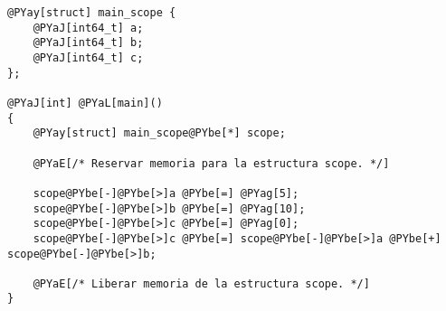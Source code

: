 \begin{Verbatim}[commandchars=@\[\]]
@PYay[struct] main_scope {
    @PYaJ[int64_t] a;
    @PYaJ[int64_t] b;
    @PYaJ[int64_t] c;
};

@PYaJ[int] @PYaL[main]()
{
    @PYay[struct] main_scope@PYbe[*] scope;
    
    @PYaE[/* Reservar memoria para la estructura scope. */]

    scope@PYbe[-]@PYbe[>]a @PYbe[=] @PYag[5];
    scope@PYbe[-]@PYbe[>]b @PYbe[=] @PYag[10];
    scope@PYbe[-]@PYbe[>]c @PYbe[=] @PYag[0];
    scope@PYbe[-]@PYbe[>]c @PYbe[=] scope@PYbe[-]@PYbe[>]a @PYbe[+] scope@PYbe[-]@PYbe[>]b;

    @PYaE[/* Liberar memoria de la estructura scope. */]
}
\end{Verbatim}
